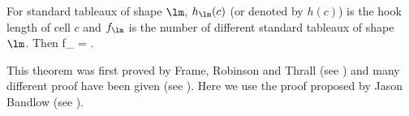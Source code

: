 \begin{theorem}
For standard tableaux of shape $\lm$, $h_{\lm}(c)$ (or denoted by $h(c)$) is the hook length of cell $c$ and $f_{\lm}$ is the number of different standard tableaux of shape $
\lm$. Then
\be
f_{\lm} = .
\ee
\end{theorem}

\begin{remark}
This theorem was first proved by Frame, Robinson and Thrall (see \cite{Frame_Robinson_Thrall_1954}) and many different proof have been given (see \cite{Greene_Nijenhuis_Wilf_1979, Krattenthaler_1995, Novelli_Pak_Stoyanovskii_1997}). Here we use the proof proposed by Jason Bandlow (see \cite{Bandlow_2008}).
\end{remark}

